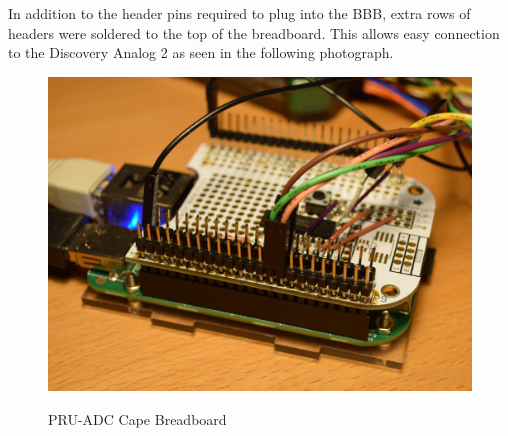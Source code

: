 In addition to the header pins required to plug into the BBB, extra rows of headers were soldered to the top of the breadboard.  This allows easy connection to the Discovery Analog 2 as seen in the following photograph.

\begin{figure}[h]
	\centering
	\includegraphics{photos/DSC_0025}
	\centering\bfseries
	\caption{PRU-ADC Cape Breadboard}
\end{figure}

